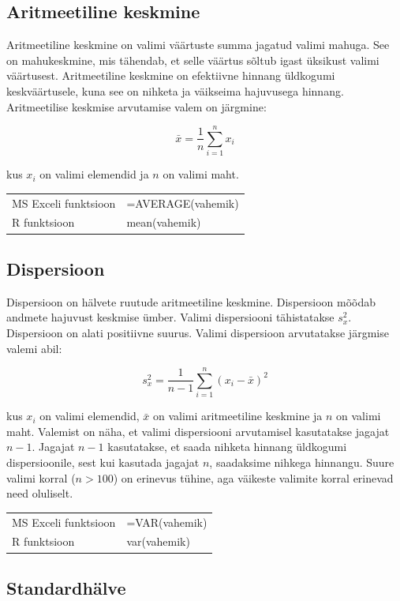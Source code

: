 \documentclass[
]{book}
\begin{document}
\subsection{Aritmeetiline keskmine}\label{aritmeetiline-keskmine-1}

Aritmeetiline keskmine on valimi väärtuste summa jagatud valimi mahuga. See on mahukeskmine, mis tähendab, et selle väärtus sõltub igast üksikust valimi väärtusest. Aritmeetiline keskmine on efektiivne hinnang üldkogumi keskväärtusele, kuna see on nihketa ja väikseima hajuvusega hinnang. Aritmeetilise keskmise arvutamise valem on järgmine:

\[\bar{x} = \frac{1}{n} \sum_{i=1}^{n} x_i\]

kus \(x_i\) on valimi elemendid ja \(n\) on valimi maht.

\begin{tabular}{ll}
MS Exceli funktsioon & =AVERAGE(vahemik)\\
R funktsioon & mean(vahemik) \\
\end{tabular}

\subsection{Dispersioon}\label{dispersioon}

Dispersioon on hälvete ruutude aritmeetiline keskmine. Dispersioon mõõdab andmete hajuvust keskmise ümber. Valimi dispersiooni tähistatakse \(s_x^2\). Dispersioon on alati positiivne suurus. Valimi dispersioon arvutatakse järgmise valemi abil:

\[s_x^2 = \frac{1}{n-1} \sum_{i=1}^{n} (x_i - \bar{x})^2\]

kus \(x_i\) on valimi elemendid, \(\bar{x}\) on valimi aritmeetiline keskmine ja \(n\) on valimi maht. Valemist on näha, et valimi dispersiooni arvutamisel kasutatakse jagajat \(n-1\). Jagajat \(n-1\) kasutatakse, et saada nihketa hinnang üldkogumi dispersioonile, sest kui kasutada jagajat \(n\), saadaksime nihkega hinnangu. Suure valimi korral (\(n > 100\)) on erinevus tühine, aga väikeste valimite korral erinevad need oluliselt.

\begin{tabular}{ll}
MS Exceli funktsioon & =VAR(vahemik)\\
R funktsioon & var(vahemik) \\
\end{tabular}

\subsection{Standardhälve}\label{standardhuxe4lve}
\end{document}
